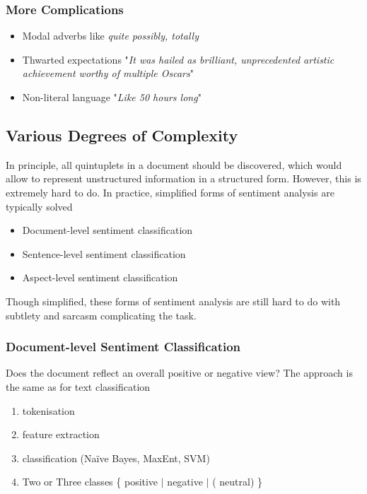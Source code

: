 \documentclass[11pt]{article}
\begin{document}
\subsubsection{More Complications}
\begin{itemize}
	\item Modal adverbs like \emph{quite possibly, totally}
	\item Thwarted expectations "\emph{It was hailed as brilliant, unprecedented artistic achievement worthy of multiple Oscars}"
	\item Non-literal language "\emph{Like 50 hours long}"
\end{itemize}

\subsection{Various Degrees of Complexity}
In principle, all quintuplets in a document should be discovered, which would allow to represent unstructured information in a structured form. However, this is extremely hard to do. In practice, simplified forms of sentiment analysis are typically solved
\begin{itemize}
	\item Document-level sentiment classification
	\item Sentence-level sentiment classification
	\item Aspect-level sentiment classification
\end{itemize}
Though simplified, these forms of sentiment analysis are still hard to do with subtlety and sarcasm complicating the task.

\subsubsection{Document-level Sentiment Classification}
Does the document reflect an overall {\color{green} positive} or {\color{red} negative} view? The approach is the same as for text classification
\begin{enumerate}
	\item tokenisation
	\item feature extraction
	\item classification (Naïve Bayes, MaxEnt, SVM)
	\item Two or Three classes \{ {\color{green} positive} $\vert$ {\color{red} negative} $\vert$ ({\color{gray} neutral}) \}
\end{enumerate}
\end{document}
